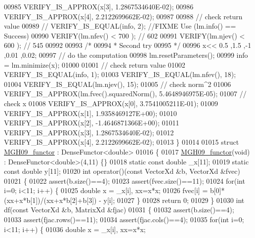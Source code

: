 \begin{DoxyCode}
00985   VERIFY\_IS\_APPROX(x[3], 1.2867534640E-02);
00986   VERIFY\_IS\_APPROX(x[4], 2.2122699662E-02);
00987   
00988     \textcolor{comment}{// check return value}
00989 \textcolor{comment}{//   VERIFY\_IS\_EQUAL(info, 2);  //FIXME Use (lm.info() == Success)}
00990   VERIFY(lm.nfev() < 700 ); \textcolor{comment}{// 602}
00991   VERIFY(lm.njev() < 600 ); \textcolor{comment}{// 545}
00992 
00993   \textcolor{comment}{/*}
00994 \textcolor{comment}{   * Second try}
00995 \textcolor{comment}{   */}
00996   x<< 0.5  ,1.5  ,-1   ,0.01 ,0.02;
00997   \textcolor{comment}{// do the computation}
00998   lm.resetParameters();
00999   info = lm.minimize(x);
01000 
01001   \textcolor{comment}{// check return value}
01002   VERIFY\_IS\_EQUAL(info, 1);
01003   VERIFY\_IS\_EQUAL(lm.nfev(), 18);
01004   VERIFY\_IS\_EQUAL(lm.njev(), 15);
01005   \textcolor{comment}{// check norm^2}
01006   VERIFY\_IS\_APPROX(lm.fvec().squaredNorm(), 5.4648946975E-05);
01007   \textcolor{comment}{// check x}
01008   VERIFY\_IS\_APPROX(x[0], 3.7541005211E-01);
01009   VERIFY\_IS\_APPROX(x[1], 1.9358469127E+00);
01010   VERIFY\_IS\_APPROX(x[2], -1.4646871366E+00);
01011   VERIFY\_IS\_APPROX(x[3], 1.2867534640E-02);
01012   VERIFY\_IS\_APPROX(x[4], 2.2122699662E-02);
01013 \}
01014 
01015 \textcolor{keyword}{struct }\hyperlink{struct_m_g_h09__functor}{MGH09\_functor} : DenseFunctor<double>
01016 \{
01017     \hyperlink{struct_m_g_h09__functor}{MGH09\_functor}(\textcolor{keywordtype}{void}) : DenseFunctor<double>(4,11) \{\}
01018     \textcolor{keyword}{static} \textcolor{keyword}{const} \textcolor{keywordtype}{double} \_x[11];
01019     \textcolor{keyword}{static} \textcolor{keyword}{const} \textcolor{keywordtype}{double} y[11];
01020     \textcolor{keywordtype}{int} operator()(\textcolor{keyword}{const} VectorXd &b, VectorXd &fvec)
01021     \{
01022         assert(b.size()==4);
01023         assert(fvec.size()==11);
01024         \textcolor{keywordflow}{for}(\textcolor{keywordtype}{int} i=0; i<11; i++) \{
01025             \textcolor{keywordtype}{double} x = \_x[i], xx=x*x;
01026             fvec[i] = b[0]*(xx+x*b[1])/(xx+x*b[2]+b[3]) - y[i];
01027         \}
01028         \textcolor{keywordflow}{return} 0;
01029     \}
01030     \textcolor{keywordtype}{int} df(\textcolor{keyword}{const} VectorXd &b, MatrixXd &fjac)
01031     \{
01032         assert(b.size()==4);
01033         assert(fjac.rows()==11);
01034         assert(fjac.cols()==4);
01035         \textcolor{keywordflow}{for}(\textcolor{keywordtype}{int} i=0; i<11; i++) \{
01036             \textcolor{keywordtype}{double} x = \_x[i], xx=x*x;

\end{DoxyCode}
